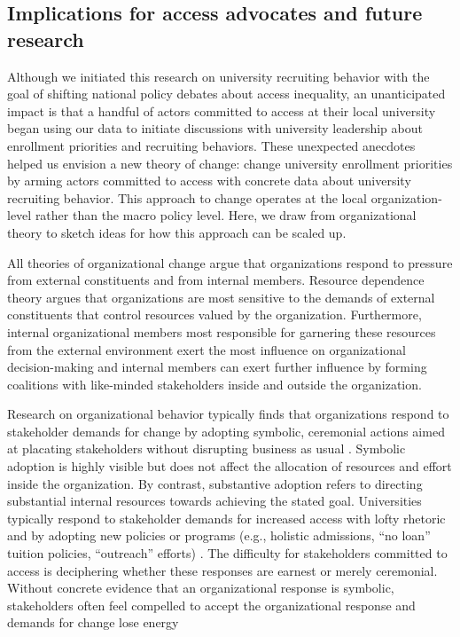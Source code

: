 \documentclass[twoside]{article}
\begin{document}
\subsection*{Implications for access advocates and future research}

Although we initiated this research on university recruiting behavior with the goal of shifting national policy debates about access inequality, an unanticipated impact is that a handful of actors committed to access at their local university began using our data to initiate discussions with university leadership about enrollment priorities and recruiting behaviors.  These unexpected anecdotes helped us envision a new theory of change: change university enrollment priorities by arming actors committed to access with concrete data about university recruiting behavior.  This approach to change operates at the local organization-level rather than the macro policy level. Here, we draw from organizational theory to sketch ideas for how this approach can be scaled up.

All theories of organizational change argue that organizations respond to pressure from external constituents and from internal members.  Resource dependence theory \citep{RN959} argues that organizations are most sensitive to the demands of external constituents that control resources valued by the organization.  Furthermore, internal organizational members most responsible for garnering these resources from the external environment exert the most influence on organizational decision-making and internal members can exert further influence by forming coalitions with like-minded stakeholders inside and outside the organization.

Research on organizational behavior typically finds that organizations respond to stakeholder demands for change by adopting symbolic, ceremonial actions aimed at placating stakeholders without disrupting business as usual \citep{RN513,RN1714}.  Symbolic adoption is highly visible but does not affect the allocation of resources and effort inside the organization. By contrast, substantive adoption refers to directing substantial internal resources towards achieving the stated goal. Universities typically respond to stakeholder demands for increased access with lofty rhetoric and by adopting new policies or programs (e.g., holistic admissions, ``no loan'' tuition policies, ``outreach'' efforts) \citep[e.g., ][]{RN4017}.  The difficulty for stakeholders committed to access is deciphering whether these responses are earnest or merely ceremonial. Without concrete evidence that an organizational response is symbolic, stakeholders often feel compelled to accept the organizational response and demands for change lose energy
\end{document}
